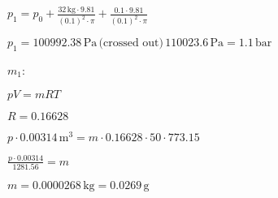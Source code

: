 \( p_1 = p_0 + \frac{32 \, \text{kg} \cdot 9.81}{(0.1)^2 \cdot \pi} + \frac{0.1 \cdot 9.81}{(0.1)^2 \cdot \pi} \)  

\( p_1 = 100992.38 \, \text{Pa} \, \text{(crossed out)} \, 110023.6 \, \text{Pa} = 1.1 \, \text{bar} \)  

\( m_1 \):  

\( pV = mRT \)  

\( R = 0.16628 \)  

\( p \cdot 0.00314 \, \text{m}^3 = m \cdot 0.16628 \cdot 50 \cdot 773.15 \)  

\( \frac{p \cdot 0.00314}{1281.56} = m \)  

\( m = 0.0000268 \, \text{kg} = 0.0269 \, \text{g} \)